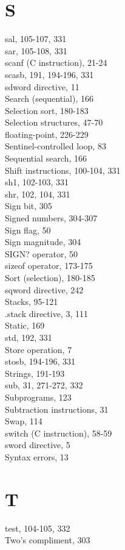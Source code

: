 \documentclass[10pt]{article}
\begin{document}
\section*{S}
sal, 105-107, 331\\
sar, 105-108, 331\\
scanf (C instruction), 21-24\\
scasb, 191, 194-196, 331\\
sdword directive, 11\\
Search (sequential), 166\\
Selection sort, 180-183\\
Selection structures, 47-70\\
floating-point, 226-229\\
Sentinel-controlled loop, 83\\
Sequential search, 166\\
Shift instructions, 100-104, 331\\
sh1, 102-103, 331\\
shr, 102, 104, 331\\
Sign bit, 305\\
Signed numbers, 304-307\\
Sign flag, 50\\
Sign magnitude, 304\\
SIGN? operator, 50\\
sizeof operator, 173-175\\
Sort (selection), 180-185\\
sqword directive, 242\\
Stacks, 95-121\\
.stack directive, 3, 111\\
Static, 169\\
std, 192, 331\\
Store operation, 7\\
stosb, 194-196, 331\\
Strings, 191-193\\
sub, 31, 271-272, 332\\
Subprograms, 123\\
Subtraction instructions, 31\\
Swap, 114\\
switch (C instruction), 58-59\\
sword directive, 5\\
Syntax errors, 13

\section*{T}
test, 104-105, 332\\
Two's compliment, 303
\end{document}
